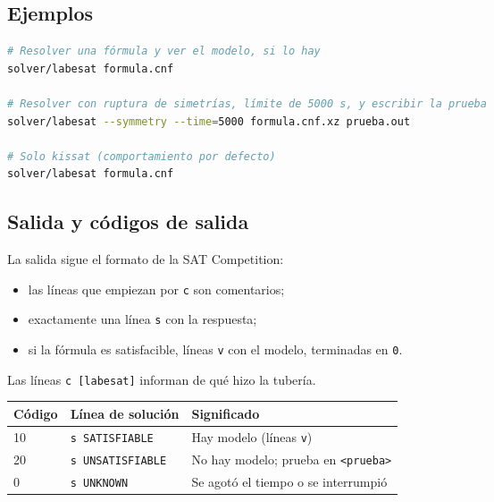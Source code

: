 \documentclass[11pt,a4paper]{article}
\begin{document}
\subsection{Ejemplos}
\begin{lstlisting}[language=bash]
# Resolver una fórmula y ver el modelo, si lo hay
solver/labesat formula.cnf

# Resolver con ruptura de simetrías, límite de 5000 s, y escribir la prueba
solver/labesat --symmetry --time=5000 formula.cnf.xz prueba.out

# Solo kissat (comportamiento por defecto)
solver/labesat formula.cnf
\end{lstlisting}

\subsection{Salida y códigos de salida}
La salida sigue el formato de la SAT Competition:
\begin{itemize}
  \item las líneas que empiezan por \texttt{c} son comentarios;
  \item exactamente una línea \texttt{s} con la respuesta;
  \item si la fórmula es satisfacible, líneas \texttt{v} con el modelo,
        terminadas en \texttt{0}.
\end{itemize}
Las líneas \texttt{c [labesat]} informan de qué hizo la tubería.

\begin{center}
\begin{tabular}{@{}lll@{}}
\toprule
Código & Línea de solución & Significado \\
\midrule
10 & \texttt{s SATISFIABLE}   & Hay modelo (líneas \texttt{v}) \\
20 & \texttt{s UNSATISFIABLE} & No hay modelo; prueba en \texttt{<prueba>} \\
0  & \texttt{s UNKNOWN}       & Se agotó el tiempo o se interrumpió \\
\bottomrule
\end{tabular}
\end{center}
\end{document}
